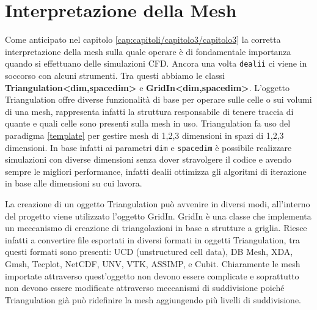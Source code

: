     \section{Interpretazione della Mesh}
    Come anticipato nel capitolo \ref{cap:capitoli/capitolo3/capitolo3} la corretta interpretazione della mesh sulla quale operare è di fondamentale importanza quando
    si effettuano delle simulazioni CFD. Ancora una volta \texttt{dealii} ci viene in soccorso con alcuni strumenti.
    Tra questi abbiamo le classi \textbf{Triangulation<dim,spacedim>} e \textbf{GridIn<dim,spacedim>}.
    L'oggetto Triangulation offre diverse funzionalità di base per operare sulle celle o sui volumi di una mesh, rappresenta infatti la struttura responsabile di tenere traccia
    di quante e quali celle sono presenti sulla mesh in uso. Triangulation fa uso del paradigma \ref*{template} per gestire mesh di 1,2,3 dimensioni in spazi di 1,2,3 dimensioni.
    In base infatti ai parametri \texttt{dim} e \texttt{spacedim} è possibile realizzare simulazioni con diverse dimensioni senza dover stravolgere il codice e avendo sempre le
    migliori performance, infatti dealii ottimizza gli algoritmi di iterazione in base alle dimensioni su cui lavora.

    La creazione di un oggetto Triangulation può avvenire in diversi modi, all'interno del progetto viene utilizzato l'oggetto GridIn.
    GridIn è una classe che implementa un meccanismo di creazione di triangolazioni in base a strutture a griglia. Riesce infatti a convertire file esportati in diversi formati
    in oggetti Triangulation, tra questi formati sono presenti: UCD (unstructured cell data), DB Mesh, XDA, Gmsh, Tecplot, NetCDF, UNV, VTK, ASSIMP, e Cubit.
    Chiaramente le mesh importate attraverso quest'oggetto non devono essere complicate e soprattutto non devono essere modificate attraverso meccanismi di suddivisione
    poiché Triangulation già può ridefinire la mesh aggiungendo più livelli di suddivisione.

